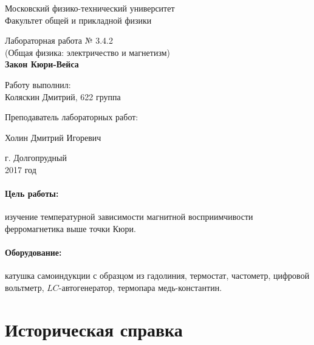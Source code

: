 \documentclass[12pt]{kiarticle}
\begin{document}
\begin{titlepage}
	\begin{center}
		\large 	Московский физико-технический университет \\
		Факультет общей и прикладной физики \\
		\vspace{0.2cm}
		
		\vspace{4.5cm}
		Лабораторная работа № 3.4.2 \\ \vspace{0.2cm}
		\large (Общая физика: электричество и магнетизм) \\ \vspace{0.2cm}
		\LARGE \textbf{Закон Кюри-Вейса}
	\end{center}
	\vspace{2.3cm} \large
	
	\begin{center}
		Работу выполнил: \\
		Коляскин Дмитрий,
		622 группа
		\vspace{10mm}
		
		Преподаватель лабораторных работ: 
		
		Холин Дмитрий Игоревич
		
		
	\end{center}
	
	\begin{center} \vspace{50mm}
		г. Долгопрудный \\
		 2017 год
	\end{center}
\end{titlepage}

\paragraph*{Цель работы:} изучение температурной зависимости магнитной восприимчивости ферромагнетика выше точки Кюри.

\paragraph*{Оборудование:} катушка самоиндукции с образцом из гадолиния, термостат, частометр, цифровой вольтметр, $ LC $-автогенератор, термопара медь-константин.


\section{Историческая справка}
\end{document}
